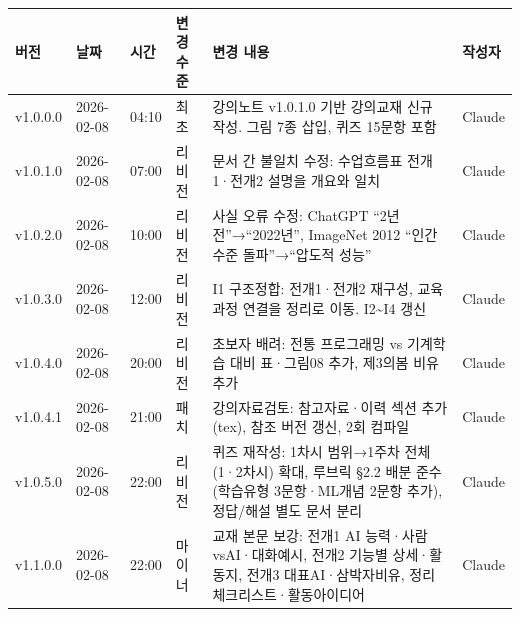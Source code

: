 \documentclass[11pt,a4paper]{article}
\renewcommand{\arraystretch}{1.4}
\begin{document}
\begin{center}
\renewcommand{\arraystretch}{1.3}
\begin{tabular}{|l|l|l|l|p{4.5cm}|l|}
\hline
\rowcolor{tableheader}
\textbf{버전} & \textbf{날짜} & \textbf{시간} & \textbf{변경 수준} & \textbf{변경 내용} & \textbf{작성자} \\
\hline
v1.0.0.0 & 2026-02-08 & 04:10 & 최초 & 강의노트 v1.0.1.0 기반 강의교재 신규 작성. 그림 7종 삽입, 퀴즈 15문항 포함 & Claude \\
\hline
v1.0.1.0 & 2026-02-08 & 07:00 & 리비전 & 문서 간 불일치 수정: 수업흐름표 전개1·전개2 설명을 개요와 일치 & Claude \\
\hline
v1.0.2.0 & 2026-02-08 & 10:00 & 리비전 & 사실 오류 수정: ChatGPT ``2년 전''→``2022년'', ImageNet 2012 ``인간 수준 돌파''→``압도적 성능'' & Claude \\
\hline
v1.0.3.0 & 2026-02-08 & 12:00 & 리비전 & I1 구조정합: 전개1·전개2 재구성, 교육과정 연결을 정리로 이동. I2\textasciitilde I4 갱신 & Claude \\
\hline
v1.0.4.0 & 2026-02-08 & 20:00 & 리비전 & 초보자 배려: 전통 프로그래밍 vs 기계학습 대비 표·그림08 추가, 제3의봄 비유 추가 & Claude \\
\hline
v1.0.4.1 & 2026-02-08 & 21:00 & 패치 & 강의자료검토: 참고자료·이력 섹션 추가(tex), 참조 버전 갱신, 2회 컴파일 & Claude \\
\hline
v1.0.5.0 & 2026-02-08 & 22:00 & 리비전 & 퀴즈 재작성: 1차시 범위→1주차 전체(1·2차시) 확대, 루브릭 \S 2.2 배분 준수(학습유형 3문항·ML개념 2문항 추가), 정답/해설 별도 문서 분리 & Claude \\
\hline
v1.1.0.0 & 2026-02-08 & 22:00 & 마이너 & 교재 본문 보강: 전개1 AI 능력·사람vsAI·대화예시, 전개2 기능별 상세·활동지, 전개3 대표AI·삼박자비유, 정리 체크리스트·활동아이디어 & Claude \\
\hline
\end{tabular}
\end{center}
\end{document}
